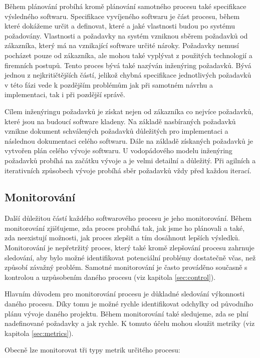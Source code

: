 \documentclass[czech,master,public,dept460,male,cpdeclaration,oneside]{diploma}
\begin{document}
Během plánování probíhá kromě plánování samotného procesu také specifikace výsledného softwaru. Specifikace vyvíjeného softwaru je část procesu, během které dokážeme určit a definovat, které a jaké vlastnosti budou po systému požadovány. Vlastnosti a požadavky na systém vzniknou sběrem požadavků od zákazníka, který má na vznikající software určité nároky. Požadavky nemusí pocházet pouze od zákazníka, ale mohou také vyplývat z použitých technologií a firemních postupů. Tento proces bývá také nazýván inženýring požadavků. Bývá jednou z nejkritičtějších částí, jelikož chybná specifikace jednotlivých požadavků v této fázi vede k pozdějším problémům jak při samotném návrhu a implementaci, tak i při pozdější správě.

Cílem inženýringu požadavků je získat nejen od zákazníka co nejvíce požadavků, které jsou na budoucí software kladeny. Na základě nasbíraných požadavků vznikne dokument schválených požadavků důležitých pro implementaci a následnou dokumentaci celého softwaru. Dále na základě získaných požadavků je vytvořen plán celého vývoje softwaru. U vodopádového modelu inženýring požadavků probíhá na začátku vývoje a je velmi detailní a důležitý. Při agilních a iterativních způsobech vývoje probíhá sběr požadavků vždy před každou iterací.

\subsection{Monitorování}
Další důležitou částí každého softwarového procesu je jeho monitorování. Během monitorování zjišťujeme, zda proces probíhá tak, jak jsme ho plánovali a také, zda neexistují možnosti, jak proces zlepšit a tím dosáhnout lepších výsledků. Monitorování je nepřetržitý proces, který také kromě zlepšování procesu zahrnuje sledování, aby bylo možné identifikovat potenciální problémy dostatečně včas, než způsobí závažný problém. Samotné monitorování je často prováděno současně s kontrolou a uzpůsobením daného procesu (viz kapitola \ref{sec:control}).

Hlavním důvodem pro monitorování procesu je důkladné sledování výkonnosti daného procesu. Díky tomu je možné rychle identifikovat odchylky od původního plánu vývoje daného projektu. Během monitorování také sledujeme, zda se plní nadefinované požadavky a jak rychle. K tomuto účelu mohou sloužit metriky (viz kapitola \ref{sec:metrics}).

Obecně lze monitorovat tři typy metrik určitého procesu:
\end{document}
